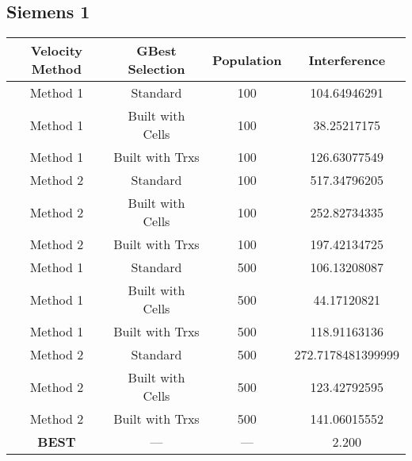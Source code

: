 \subsection{Siemens 1}
\begin{center}
	\begin{tabular}{| c | c | c | c |}
	\hline
	Velocity Method & GBest Selection & Population & Interference\\ \hline
	Method 1 & Standard & 100 & 104.64946291\\ \hline
	Method 1 & Built with Cells & 100 & 38.25217175\\ \hline
	Method 1 & Built with Trxs & 100 & 126.63077549\\ \hline
	Method 2 & Standard & 100 & 517.34796205\\ \hline
	Method 2 & Built with Cells & 100 & 252.82734335\\ \hline
	Method 2 & Built with Trxs & 100 & 197.42134725\\ \hline
	Method 1 & Standard & 500 & 106.13208087\\ \hline
	Method 1 & Built with Cells & 500 & 44.17120821\\ \hline
	Method 1 & Built with Trxs & 500 & 118.91163136\\ \hline
	Method 2 & Standard & 500 & 272.7178481399999\\ \hline
	Method 2 & Built with Cells & 500 & 123.42792595\\ \hline
	Method 2 & Built with Trxs & 500 & 141.06015552\\ \hline
	\textbf{BEST} & --- & --- & 2.200\\ \hline
	\end{tabular}
\end{center}
